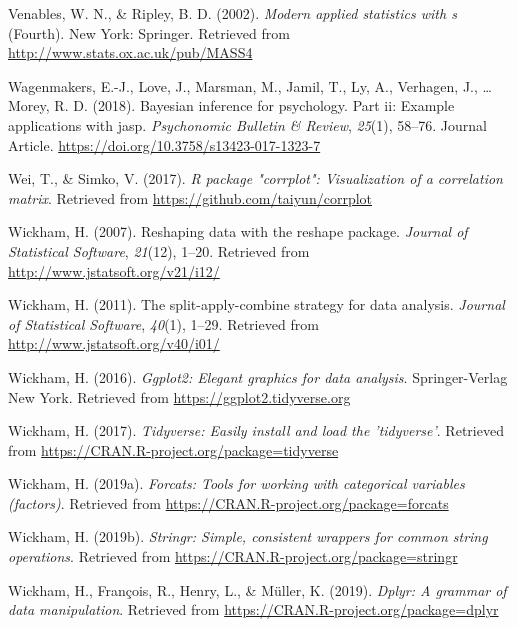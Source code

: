 \documentclass[man]{apa6}
\begin{document}
\leavevmode\hypertarget{ref-R-MASS}{}%
Venables, W. N., \& Ripley, B. D. (2002). \emph{Modern applied statistics with s} (Fourth). New York: Springer. Retrieved from \url{http://www.stats.ox.ac.uk/pub/MASS4}

\leavevmode\hypertarget{ref-Wagenmakers_2018_JASP}{}%
Wagenmakers, E.-J., Love, J., Marsman, M., Jamil, T., Ly, A., Verhagen, J., \ldots{} Morey, R. D. (2018). Bayesian inference for psychology. Part ii: Example applications with jasp. \emph{Psychonomic Bulletin \& Review}, \emph{25}(1), 58--76. Journal Article. \url{https://doi.org/10.3758/s13423-017-1323-7}

\leavevmode\hypertarget{ref-R-corrplot2017}{}%
Wei, T., \& Simko, V. (2017). \emph{R package "corrplot": Visualization of a correlation matrix}. Retrieved from \url{https://github.com/taiyun/corrplot}

\leavevmode\hypertarget{ref-R-reshape2}{}%
Wickham, H. (2007). Reshaping data with the reshape package. \emph{Journal of Statistical Software}, \emph{21}(12), 1--20. Retrieved from \url{http://www.jstatsoft.org/v21/i12/}

\leavevmode\hypertarget{ref-R-plyr}{}%
Wickham, H. (2011). The split-apply-combine strategy for data analysis. \emph{Journal of Statistical Software}, \emph{40}(1), 1--29. Retrieved from \url{http://www.jstatsoft.org/v40/i01/}

\leavevmode\hypertarget{ref-R-ggplot2}{}%
Wickham, H. (2016). \emph{Ggplot2: Elegant graphics for data analysis}. Springer-Verlag New York. Retrieved from \url{https://ggplot2.tidyverse.org}

\leavevmode\hypertarget{ref-R-tidyverse}{}%
Wickham, H. (2017). \emph{Tidyverse: Easily install and load the 'tidyverse'}. Retrieved from \url{https://CRAN.R-project.org/package=tidyverse}

\leavevmode\hypertarget{ref-R-forcats}{}%
Wickham, H. (2019a). \emph{Forcats: Tools for working with categorical variables (factors)}. Retrieved from \url{https://CRAN.R-project.org/package=forcats}

\leavevmode\hypertarget{ref-R-stringr}{}%
Wickham, H. (2019b). \emph{Stringr: Simple, consistent wrappers for common string operations}. Retrieved from \url{https://CRAN.R-project.org/package=stringr}

\leavevmode\hypertarget{ref-R-dplyr}{}%
Wickham, H., François, R., Henry, L., \& Müller, K. (2019). \emph{Dplyr: A grammar of data manipulation}. Retrieved from \url{https://CRAN.R-project.org/package=dplyr}
\end{document}
